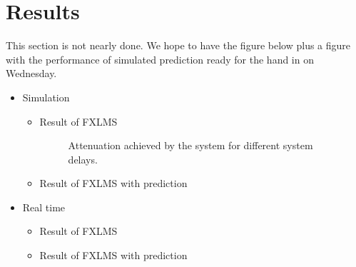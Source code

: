 \section*{Results}
This section is not nearly done. We hope to have the figure below plus a figure with the performance of simulated prediction ready for the hand in on Wednesday. 
\begin{itemize}
\item Simulation
\begin{itemize}
\item Result of FXLMS
\begin{figure}[H]
	\centering
	
	\caption{Attenuation achieved by the system for different system delays.}
	\label{Fig:Reference to noise ratio}
\end{figure}
\item Result of FXLMS with prediction
\end{itemize}
\item Real time 
\begin{itemize}
\item Result of FXLMS
\item Result of FXLMS with prediction
\end{itemize}
\end{itemize} 

